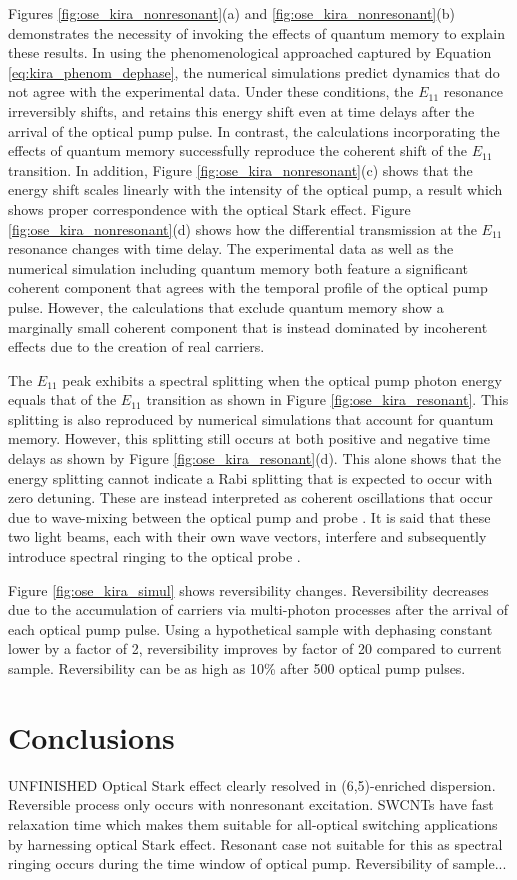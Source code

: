 Figures \ref{fig:ose_kira_nonresonant}(a) and \ref{fig:ose_kira_nonresonant}(b) demonstrates the necessity of invoking the effects of quantum memory to explain these results. In using the phenomenological approached captured by Equation \eqref{eq:kira_phenom_dephase}, the numerical simulations predict dynamics that do not agree with the experimental data. Under these conditions, the $E_{11}$ resonance irreversibly shifts, and retains this energy shift even at time delays after the arrival of the optical pump pulse. In contrast, the calculations incorporating the effects of quantum memory successfully reproduce the coherent shift of the $E_{11}$ transition. In addition, Figure \ref{fig:ose_kira_nonresonant}(c) shows that the energy shift scales linearly with the intensity of the optical pump, a result which shows proper correspondence with the optical Stark effect. Figure \ref{fig:ose_kira_nonresonant}(d) shows how the differential transmission at the $E_{11}$ resonance changes with time delay. The experimental data as well as the numerical simulation including quantum memory both feature a significant coherent component that agrees with the temporal profile of the optical pump pulse. However, the calculations that exclude quantum memory show a marginally small coherent component that is instead dominated by incoherent effects due to the creation of real carriers.

The $E_{11}$ peak exhibits a spectral splitting when the optical pump photon energy equals that of the $E_{11}$ transition as shown in Figure \ref{fig:ose_kira_resonant}. This splitting is also reproduced by numerical simulations that account for quantum memory. However, this splitting still occurs at both positive and negative time delays as shown by Figure \ref{fig:ose_kira_resonant}(d). This alone shows that the energy splitting cannot indicate a Rabi splitting that is expected to occur with zero detuning. These are instead interpreted as coherent oscillations that occur due to wave-mixing between the optical pump and probe \cite{joffre1988coherent}. It is said that these two light beams, each with their own wave vectors, interfere and subsequently introduce spectral ringing to the optical probe \cite{joffre1988coherent}.

Figure \ref{fig:ose_kira_simul} shows reversibility changes. Reversibility decreases due to the accumulation of carriers via multi-photon processes after the arrival of each optical pump pulse. Using a hypothetical sample with dephasing constant lower by a factor of 2, reversibility improves by factor of 20 compared to current sample. Reversibility can be as high as 10\% after 500 optical pump pulses.

\section{Conclusions}

{\color{red} UNFINISHED} Optical Stark effect clearly resolved in (6,5)-enriched dispersion. Reversible process only occurs with nonresonant excitation. SWCNTs have fast relaxation time which makes them suitable for all-optical switching applications by harnessing optical Stark effect. Resonant case not suitable for this as spectral ringing occurs during the time window of optical pump. Reversibility of sample...
